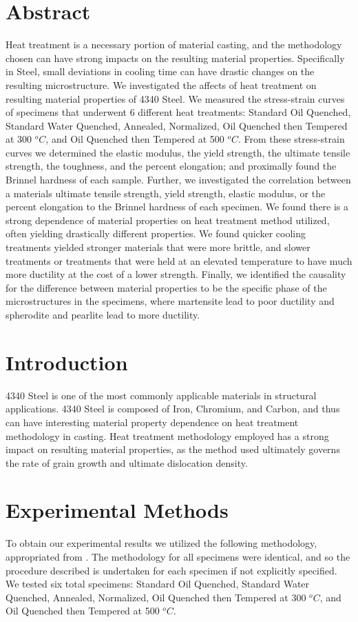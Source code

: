\documentclass{article}
\begin{document}
\section{Abstract}
Heat treatment is a necessary portion of material casting, and the methodology chosen can have strong impacts on the resulting material properties. Specifically in Steel, small deviations in cooling time can have drastic changes on the resulting microstructure. We investigated the affects of heat treatment on resulting material properties of 4340 Steel. We measured the stress-strain curves of specimens that underwent 6 different heat treatments: Standard Oil Quenched, Standard Water Quenched, Annealed, Normalized, Oil Quenched then Tempered at 300 $^oC$, and Oil Quenched then Tempered at 500 $^oC$. From these stress-strain curves we determined the elastic modulus, the yield strength, the ultimate tensile strength, the toughness, and the percent elongation; and proximally found the Brinnel hardness of each sample. Further, we investigated the correlation between a materials ultimate tensile strength, yield strength, elastic modulus, or the percent elongation to the Brinnel hardness of each specimen. We found there is a strong dependence of material properties on heat treatment method utilized, often yielding drastically different properties. We found quicker cooling treatments yielded stronger materials that were more brittle, and slower treatments or treatments that were held at an elevated temperature to have much more ductility at the cost of a lower strength. Finally, we identified the causality for the difference between material properties to be the specific phase of the microstructures in the specimens, where martensite lead to poor ductility and spherodite and pearlite lead to more ductility.

\section{Introduction}
4340 Steel is one of the most commonly applicable materials in structural applications. 4340 Steel is composed of Iron, Chromium, and Carbon, and thus can have interesting material property dependence on heat treatment methodology in casting. Heat treatment methodology employed has a strong impact on resulting material properties, as the method used ultimately governs the rate of grain growth and ultimate dislocation density.
\newpage
\section{Experimental Methods}
To obtain our experimental results we utilized the following methodology, appropriated from \cite{manual}. The methodology for all specimens were identical, and so the procedure described is undertaken for each specimen if not explicitly specified. We tested six total specimens: Standard Oil Quenched, Standard Water Quenched, Annealed, Normalized, Oil Quenched then Tempered at 300 $^oC$, and Oil Quenched then Tempered at 500 $^oC$. 
\end{document}
